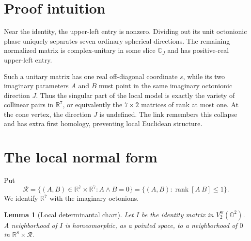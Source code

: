 \documentclass[11pt]{article}
\newtheorem{lemma}{Lemma}
\newcommand{\R}{\mathbb R}
\renewcommand{\O}{\mathbb O}
\newcommand{\cR}{\mathcal R}
\begin{document}
\section{Proof intuition}

Near the identity, the upper-left entry is nonzero. Dividing out its unit
octonionic phase uniquely separates seven ordinary spherical directions.
The remaining normalized matrix is complex-unitary in some slice
\(\mathbb C_J\) and has positive-real upper-left entry.

Such a unitary matrix has one real off-diagonal coordinate \(s\), while its
two imaginary parameters \(A\) and \(B\) must point in the same imaginary
octonionic direction \(J\). Thus the singular part of the local model is
exactly the variety of collinear pairs in \(\R^7\), or equivalently the
\(7\times2\) matrices of rank at most one. At the cone vertex, the direction
\(J\) is undefined. The link remembers this collapse and has extra first
homology, preventing local Euclidean structure.

\section{The local normal form}

Put
\[
 \cR=\{(A,B)\in\R^7\times\R^7:
             A\wedge B=0\}
     =\{(A,B):\operatorname{rank}[A\ B]\le1\}.
\]
We identify \(\R^7\) with the imaginary octonions.

\begin{lemma}[Local determinantal chart]\label{lem:chart}
Let \(I\) be the identity matrix in \(V^{\mathrm w}_2(\O^2)\). A
neighborhood of \(I\) is homeomorphic, as a pointed space, to a neighborhood
of \(0\) in \(\R^8\times\cR\).
\end{lemma}
\end{document}
